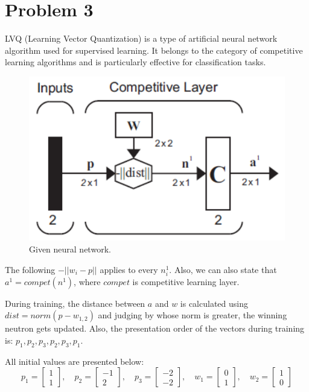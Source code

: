 \section{Problem 3}

LVQ (Learning Vector Quantization) is a type of artificial neural network algorithm used for supervised learning. It belongs to the category of competitive learning algorithms and is particularly effective for classification tasks.

\begin{figure}[htpb]
	\centering
	\includegraphics[width=0.4\linewidth]{../Problem 3/prob3_lvq_nn.png}
	\caption{Given neural network.}
\end{figure}

The following $-||w_i - p||$ applies to every $n^1_i$. Also, we can also state that $a^1 = compet\left(n^1\right)$, where $compet$ is competitive learning layer.

During training, the distance between $a$ and $w$ is calculated using $dist = norm\left(p-w_{1,2}\right)$ and judging by whose norm is greater, the winning neutron gets updated.
Also, the presentation order of the vectors during training is: $p_1, p_2, p_3, p_2, p_3, p_1$.

All initial values are presented below:
\[
p_1 = \left[
\begin{array}{c}
	1\\1
\end{array}
\right], \quad
p_2 = \left[
\begin{array}{c}
	-1\\2
\end{array}
\right], \quad
p_3 = \left[
\begin{array}{c}
	-2\\-2
\end{array}
\right], \quad
w_1 = \left[
\begin{array}{c}
	0\\1
\end{array}
\right], \quad
w_2 = \left[
\begin{array}{c}
	1\\0
\end{array}
\right]
\]

